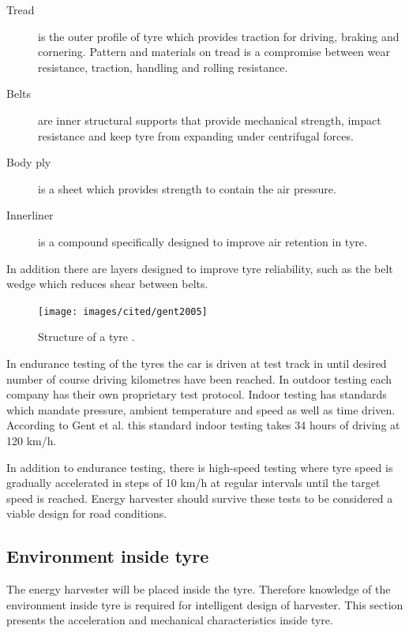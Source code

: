 \begin{description}
  \item[Tread] is the outer profile of tyre which provides traction for driving, braking and cornering. Pattern and materials on
tread is a compromise between wear resistance, traction, handling and rolling
resistance.
  \item[Belts] are inner structural supports that provide mechanical strength, impact resistance and keep tyre from expanding
under centrifugal forces.
  \item[Body ply] is a sheet which provides strength to contain the air pressure.
  \item[Innerliner] is a compound specifically designed to improve air retention in tyre.
\end{description}
In addition there are layers designed to improve tyre reliability, such as the belt
wedge which reduces shear between belts. 


\begin{figure}[h]
\begin{center}
\texttt{[image: images/cited/gent2005]}
\end{center}
\caption{Structure of a tyre \cite{Gent2005}.}
\label{fig:tyre_structure_diagram}
\end{figure}


In endurance testing of the tyres the car is driven at test track in until
desired number of course driving kilometres have been reached. In outdoor testing
each company has their own proprietary test protocol. Indoor testing has standards
which mandate pressure, ambient temperature and speed as well as time driven.
According to Gent et al. \cite{Gent2005} this standard indoor testing takes 34 hours of driving at 120
km/h.

In addition to endurance testing, there is high-speed testing where tyre speed is
gradually accelerated in steps of 10 km/h at regular intervals until the target speed is
reached. Energy harvester should survive these tests to be considered a viable design for road conditions.


\subsection{Environment inside tyre} \label{sect:tyre_environment}
The energy harvester will be placed inside the tyre. Therefore knowledge of the environment inside tyre is required for intelligent design of harvester. This section presents the acceleration and mechanical characteristics inside tyre. 

